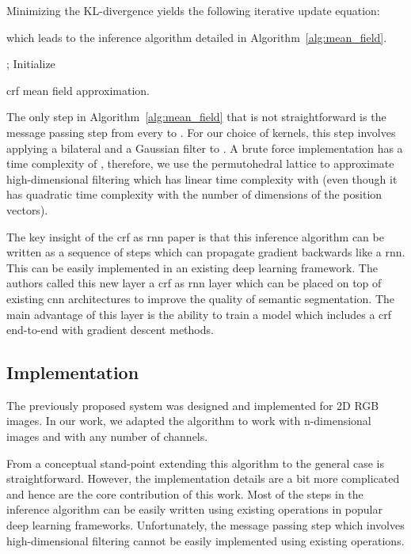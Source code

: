 \documentclass{article}
\begin{document}
Minimizing the KL-divergence yields the following iterative update equation:


which leads to the inference algorithm detailed in Algorithm~\ref{alg:mean_field}.

\begin{algorithm}
\SetAlgoLined
 ;  \hfill Initialize  
 
 \caption{\gls{crf} mean field approximation.}
 \label{alg:mean_field}
\end{algorithm}

The only step in Algorithm~\ref{alg:mean_field} that is not straightforward is the message passing step from every  to . 
For our choice of kernels, this step involves applying a bilateral and a Gaussian filter to .
A brute force implementation has a time complexity of , therefore, we use the permutohedral lattice to approximate high-dimensional filtering \cite{adams2010fast} which has linear time complexity with  (even though it has quadratic time complexity with the number of dimensions of the position vectors).


The key insight of the \gls{crf} as \gls{rnn} paper \cite{CRFasRNN} is that this inference algorithm can be written as a sequence of steps which can propagate gradient backwards like a \gls{rnn}.
This can be easily implemented in an existing deep learning framework.
The authors called this new layer a \gls{crf} as \gls{rnn} layer which can be placed on top of existing \gls{cnn} architectures to improve the quality of semantic segmentation.
The main advantage of this layer is the ability to train a model which includes a \gls{crf} end-to-end with gradient descent methods.

\subsection{Implementation}

The previously proposed system was designed and implemented for 2D RGB images.
In our work, we adapted the algorithm to work with n-dimensional images and with any number of channels.

From a conceptual stand-point extending this algorithm to the general case is straightforward.
However, the implementation details are a bit more complicated and hence are the core contribution of this work.
Most of the steps in the inference algorithm can be easily written using existing operations in popular deep learning frameworks.
Unfortunately, the message passing step which involves high-dimensional filtering cannot be easily implemented using existing operations.
\end{document}
